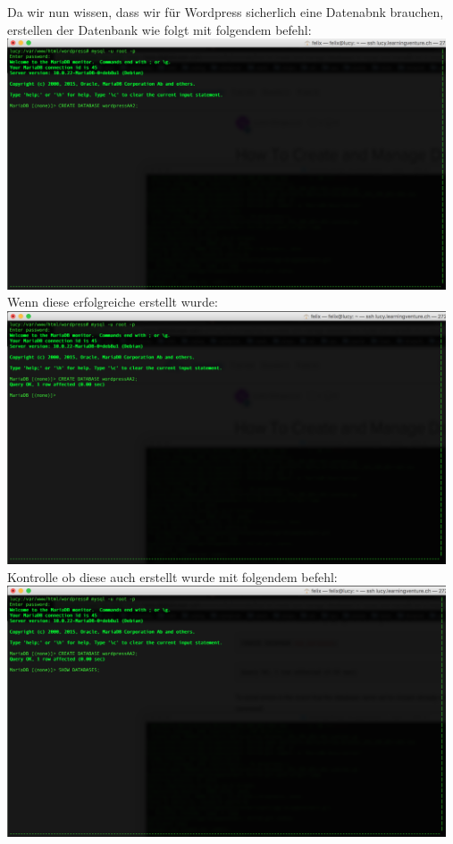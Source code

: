 \documentclass{article}
\begin{document}
	\newline
	\newline
	Da wir nun wissen, dass wir für Wordpress sicherlich eine Datenabnk brauchen, erstellen der Datenbank wie folgt mit folgendem befehl:
	\newline
	\newline
	\includegraphics[width=13cm]{../Pics/22-maria-db-create}
	\newline
	Wenn diese erfolgreiche erstellt wurde:
	\newline
	\includegraphics[width=13cm]{../Pics/23-maria-db-create-success}
	\newline
	Kontrolle ob diese auch erstellt wurde mit folgendem befehl:
	\newline
	\includegraphics[width=13cm]{../Pics/24-maria-db-show}
\end{document}
